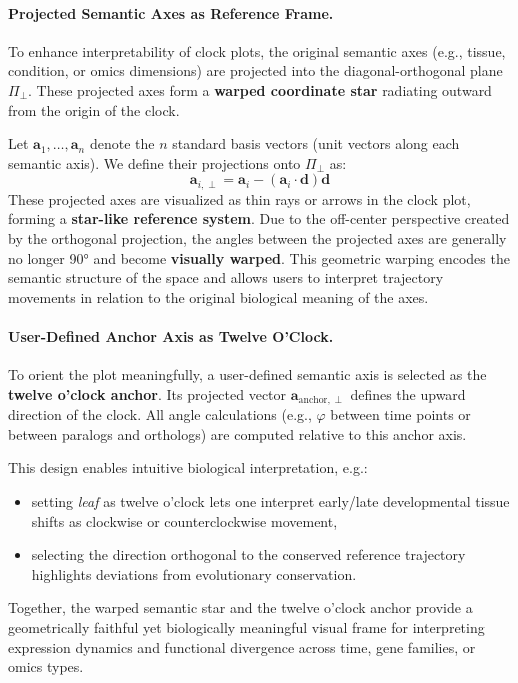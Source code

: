 \documentclass[11pt,a4paper]{article}
\begin{document}
\paragraph{Projected Semantic Axes as Reference Frame.}
To enhance interpretability of clock plots, the original semantic axes (e.g., tissue, condition, or omics dimensions) are projected into the diagonal-orthogonal plane $\Pi_{\perp}$. These projected axes form a \textbf{warped coordinate star} radiating outward from the origin of the clock.

Let $\mathbf{a}_1, \dots, \mathbf{a}_n$ denote the $n$ standard basis vectors (unit vectors along each semantic axis). We define their projections onto $\Pi_{\perp}$ as:
\[
\mathbf{a}_{i,\perp} = \mathbf{a}_i - (\mathbf{a}_i \cdot \mathbf{d}) \mathbf{d}
\]
These projected axes are visualized as thin rays or arrows in the clock plot, forming a \textbf{star-like reference system}. Due to the off-center perspective created by the orthogonal projection, the angles between the projected axes are generally no longer 90° and become \textbf{visually warped}. This geometric warping encodes the semantic structure of the space and allows users to interpret trajectory movements in relation to the original biological meaning of the axes.

\paragraph{User-Defined Anchor Axis as Twelve O’Clock.}
To orient the plot meaningfully, a user-defined semantic axis is selected as the \textbf{twelve o’clock anchor}. Its projected vector $\mathbf{a}_{\text{anchor},\perp}$ defines the upward direction of the clock. All angle calculations (e.g., $\varphi$ between time points or between paralogs and orthologs) are computed relative to this anchor axis.

This design enables intuitive biological interpretation, e.g.:
\begin{itemize}
  \item setting \textit{leaf} as twelve o’clock lets one interpret early/late developmental tissue shifts as clockwise or counterclockwise movement,
  \item selecting the direction orthogonal to the conserved reference trajectory highlights deviations from evolutionary conservation.
\end{itemize}

\medskip

Together, the warped semantic star and the twelve o’clock anchor provide a geometrically faithful yet biologically meaningful visual frame for interpreting expression dynamics and functional divergence across time, gene families, or omics types.
\end{document}
